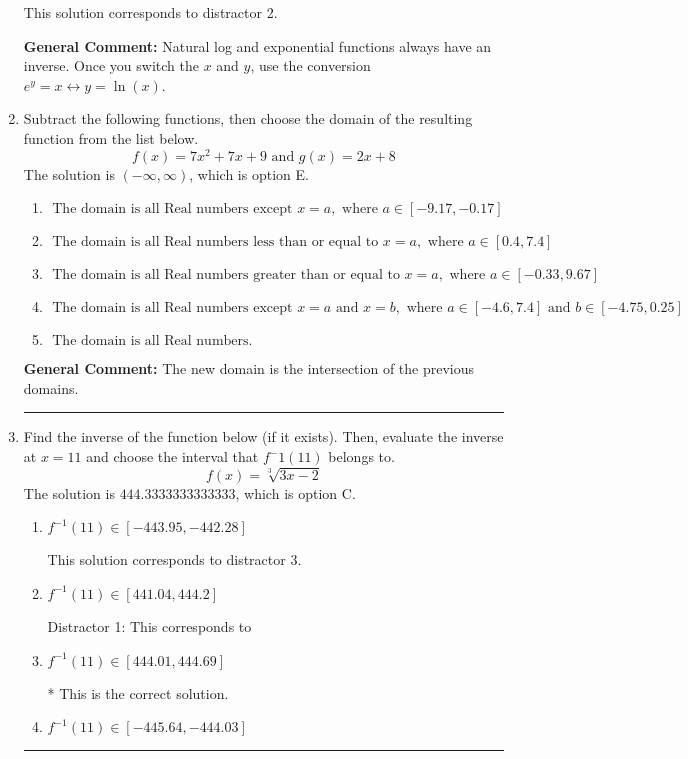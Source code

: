 \documentclass{extbook}[14pt]
\newcommand{\litem}[1]{\item #1

\rule{\textwidth}{0.4pt}}
\begin{document}
\begin{enumerate}
{\begin{enumerate}[label=\Alph*.]
 This solution corresponds to distractor 2.
\end{enumerate}

\textbf{General Comment:} Natural log and exponential functions always have an inverse. Once you switch the $x$ and $y$, use the conversion $ e^y = x \leftrightarrow y=\ln(x)$.
}
\litem{
Subtract the following functions, then choose the domain of the resulting function from the list below.
\[ f(x) = 7x^{2} +7 x + 9 \text{ and } g(x) = 2x + 8 \]The solution is \( (-\infty, \infty) \), which is option E.\begin{enumerate}[label=\Alph*.]
\item \( \text{ The domain is all Real numbers except } x = a, \text{ where } a \in [-9.17, -0.17] \)


\item \( \text{ The domain is all Real numbers less than or equal to } x = a, \text{ where } a \in [0.4, 7.4] \)


\item \( \text{ The domain is all Real numbers greater than or equal to } x = a, \text{ where } a \in [-0.33, 9.67] \)


\item \( \text{ The domain is all Real numbers except } x = a \text{ and } x = b, \text{ where } a \in [-4.6, 7.4] \text{ and } b \in [-4.75, 0.25] \)


\item \( \text{ The domain is all Real numbers. } \)


\end{enumerate}

\textbf{General Comment:} The new domain is the intersection of the previous domains.
}
\litem{
Find the inverse of the function below (if it exists). Then, evaluate the inverse at $x = 11$ and choose the interval that $f^-1(11)$ belongs to.
\[ f(x) = \sqrt[3]{3 x - 2} \]The solution is \( 444.3333333333333 \), which is option C.\begin{enumerate}[label=\Alph*.]
\item \( f^{-1}(11) \in [-443.95, -442.28] \)

 This solution corresponds to distractor 3.
\item \( f^{-1}(11) \in [441.04, 444.2] \)

 Distractor 1: This corresponds to 
\item \( f^{-1}(11) \in [444.01, 444.69] \)

* This is the correct solution.
\item \( f^{-1}(11) \in [-445.64, -444.03] \)


\end{enumerate}}
\end{enumerate}
\end{document}
